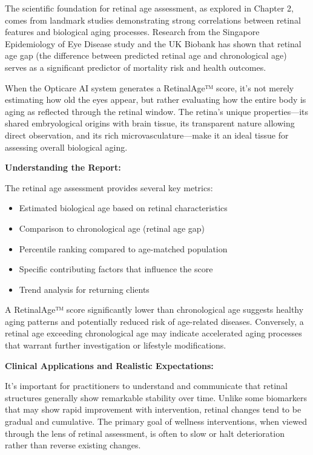 \documentclass[
  Letterpaper,
]{scrbook}
\providecommand{\tightlist}{%
  \setlength{\itemsep}{0pt}\setlength{\parskip}{0pt}}\usepackage{longtable,booktabs,array}
\begin{document}
The scientific foundation for retinal age assessment, as explored in
Chapter 2, comes from landmark studies demonstrating strong correlations
between retinal features and biological aging processes. Research from
the Singapore Epidemiology of Eye Disease study and the UK Biobank has
shown that retinal age gap (the difference between predicted retinal age
and chronological age) serves as a significant predictor of mortality
risk and health outcomes.

When the Opticare AI system generates a RetinalAge™ score, it's not
merely estimating how old the eyes appear, but rather evaluating how the
entire body is aging as reflected through the retinal window. The
retina's unique properties---its shared embryological origins with brain
tissue, its transparent nature allowing direct observation, and its rich
microvasculature---make it an ideal tissue for assessing overall
biological aging.

\textbf{Understanding the Report:}

The retinal age assessment provides several key metrics:

\begin{itemize}
\tightlist
\item
  Estimated biological age based on retinal characteristics
\item
  Comparison to chronological age (retinal age gap)
\item
  Percentile ranking compared to age-matched population
\item
  Specific contributing factors that influence the score
\item
  Trend analysis for returning clients
\end{itemize}

A RetinalAge™ score significantly lower than chronological age suggests
healthy aging patterns and potentially reduced risk of age-related
diseases. Conversely, a retinal age exceeding chronological age may
indicate accelerated aging processes that warrant further investigation
or lifestyle modifications.

\textbf{Clinical Applications and Realistic Expectations:}

It's important for practitioners to understand and communicate that
retinal structures generally show remarkable stability over time. Unlike
some biomarkers that may show rapid improvement with intervention,
retinal changes tend to be gradual and cumulative. The primary goal of
wellness interventions, when viewed through the lens of retinal
assessment, is often to slow or halt deterioration rather than reverse
existing changes.
\end{document}
